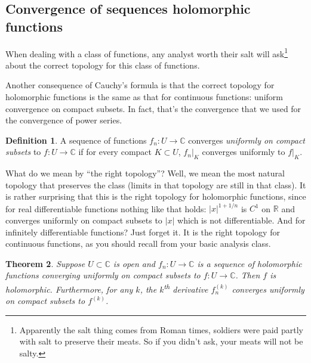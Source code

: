 \documentclass[12pt,openany]{book}
\newcommand{\sabs}[1]{\lvert {#1} \rvert}
\newcommand{\C}{{\mathbb{C}}}
\newcommand{\R}{{\mathbb{R}}}
\newcommand{\myindex}[1]{#1\index{#1}}
\theoremstyle{plain}
\newtheorem{thm}{Theorem}[section]
\theoremstyle{remark}
\theoremstyle{definition}
\newtheorem{defn}[thm]{Definition}
\theoremstyle{exercise}
\theoremstyle{example}
\begin{document}
\subsection{Convergence of sequences holomorphic functions}

When dealing with a class of functions, any analyst worth their
salt will ask\footnote{Apparently the salt thing
comes from Roman times, soldiers were
paid partly with salt to preserve their meats.  So if you didn't ask,
your meats will not be salty.} about the correct topology for this class of
functions.

Another consequence of Cauchy's formula is that the correct topology for
holomorphic functions is the same as that for continuous functions: uniform
convergence on compact subsets.  In fact, that's the convergence that we
used for the convergence of power series.

\begin{defn}
A sequence of functions $f_n \colon U \to \C$ converges
\emph{\myindex{uniformly on compact subsets}}%
to $f \colon U \to \C$ if for every compact $K \subset U$,
$f_n|_K$ converges uniformly to $f|_K$.
\end{defn}

What do we mean by ``the right topology''?  Well, we mean the most natural
topology that preserves the class (limits in that topology are still in that
class).
It is rather surprising that this is the right topology for holomorphic
functions, since for real
differentiable functions nothing like that holds: $\sabs{x}^{1+1/n}$
is $C^1$ on $\R$ and converges uniformly on compact subsets to $\sabs{x}$
which is not differentiable.  And for infinitely differentiable functions?
Just forget it.  It is the right topology for continuous functions, as you
should recall from your basic analysis class.

\begin{thm}
Suppose $U \subset \C$ is open and $f_n \colon U \to \C$ is a sequence
of holomorphic functions converging uniformly on compact subsets to
$f \colon U \to \C$.  Then $f$ is holomorphic.
Furthermore, for any $k$, the $k$\textsuperscript{th} derivative
$f_n^{(k)}$ converges uniformly on compact subsets to $f^{(k)}$.
\end{thm}
\end{document}
